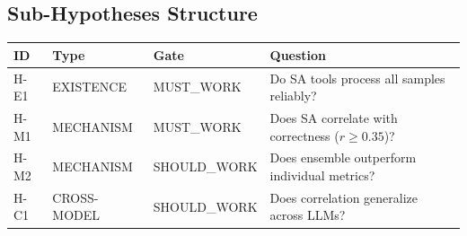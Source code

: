 \subsection{Sub-Hypotheses Structure}

\begin{table}[h]
\centering
\begin{tabular}{@{}llll@{}}
\toprule
ID & Type & Gate & Question \\
\midrule
H-E1 & EXISTENCE & MUST\_WORK & Do SA tools process all samples reliably? \\
H-M1 & MECHANISM & MUST\_WORK & Does SA correlate with correctness ($r\geq0.35$)? \\
H-M2 & MECHANISM & SHOULD\_WORK & Does ensemble outperform individual metrics? \\
H-C1 & CROSS-MODEL & SHOULD\_WORK & Does correlation generalize across LLMs? \\
\bottomrule
\end{tabular}
\end{table}
